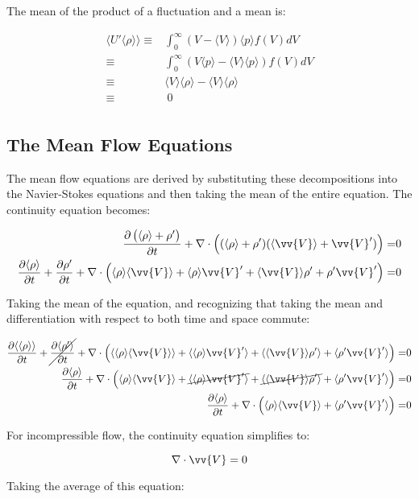 \documentclass[10pt]{article}
\newcommand{\beq}{\begin{equation}}
\newcommand{\eeq}{\end{equation}}
\newcommand{\beqa}{\begin{equation}\begin{aligned}}
\newcommand{\eeqa}{\end{aligned}\end{equation}}
\newcommand{\la}{\langle}
\newcommand{\ra}{\rangle}
\begin{document}
\begin{flushleft}
\begin{tcolorbox}[breakable]
The mean of the product of a fluctuation and a mean is:

\beqa
\la U'\la\rho\ra\ra\equiv&\int_{0}^{\infty}(V-\la V\ra)\la p\ra f(V)dV\\
\equiv&\int_{0}^{\infty}\left(V\la p\ra-\la V\ra\la p\ra\right)f(V)dV\\
\equiv&\la V\ra\la\rho\ra-\la V\ra\la\rho\ra\\
\equiv&\ 0\\
\eeqa

\end{tcolorbox}




\subsection{The Mean Flow Equations}

The mean flow equations are derived by substituting these decompositions into the Navier-Stokes equations and then taking the mean of the entire equation. The continuity equation becomes:

\beqa
\frac{\partial \left(\la\rho\ra+\rho'\right)}{\partial t}+\nabla\cdot \left((\la\rho\ra+\rho')(\la\vv{V}\ra+\vv{V}')\right)=&0\\
\frac{\partial\la\rho\ra}{\partial t}+\frac{\partial\rho'}{\partial t}+\nabla\cdot \left(\la\rho\ra\la\vv{V}\ra+\la\rho\ra\vv{V}'+\la\vv{V}\ra\rho'+\rho'\vv{V}'\right)=&0\\
\eeqa

Taking the mean of the equation, and recognizing that taking the mean and differentiation with respect to both time and space commute:

\beqa
\frac{\partial\la\la\rho\ra\ra}{\partial t}+\cancel{\frac{\partial\la\rho'\ra}{\partial t}}+\nabla\cdot\left(\la\la\rho\ra\la\vv{V}\ra\ra+\la\la\rho\ra\vv{V}'\ra+\la\la\vv{V}\ra\rho'\ra+\la\rho'\vv{V}'\ra\right)=&0\\
\frac{\partial\la\rho\ra}{\partial t}+\nabla\cdot\left(\la\rho\ra\la\vv{V}\ra+\cancel{\la\la\rho\ra\vv{V}'\ra}+\cancel{\la\la\vv{V}\ra\rho'\ra}+\la\rho'\vv{V}'\ra\right)=&0\\
\frac{\partial\la\rho\ra}{\partial t}+\nabla\cdot\left(\la\rho\ra\la\vv{V}\ra+\la\rho'\vv{V}'\ra\right)=&0\\
\eeqa

For incompressible flow, the continuity equation simplifies to:

\beq
\label{eq:1}
\nabla\cdot\vv{V}=0
\eeq

Taking the average of this equation:


\end{flushleft}
\end{document}
